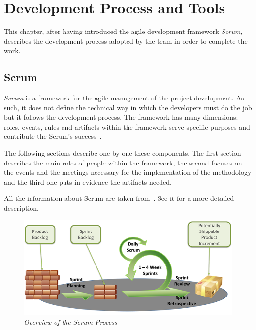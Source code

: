 \chapter{Development Process and Tools}\label{devProcChap}
This chapter, after having introduced the agile development framework \emph{Scrum}, describes the development process adopted by the team in order to complete the work.

	\section{Scrum}\label{ref_scrum}
	\emph{Scrum} is a framework for the agile management of the project development. 
	As such, it does not define the technical way in which the developers must do the job but it follows the development process. 	
	The framework has many dimensions: roles, events, rules and artifacts within the framework serve specific purposes and contribute the Scrum's success~\cite{scrumEnglishGuide}.  

	The following sections describe one by one these components. The first section describes the main roles of people within the framework, the second focuses on the events and the meetings necessary for the implementation of the methodology and the third one puts in evidence the artifacts needed.

	All the information about Scrum are taken from~\cite{scrumEnglishGuide}. See it for a more detailed description.

	\begin{figure}[h]
	  \begin{center} 
	    \includegraphics[scale=0.45]{images/ch_04/scrum_overview.png}
	  \end{center} 
	  \caption{\textit{Overview of the Scrum Process}}  
	  \label{fig:ScrumOverview}
  	\end{figure}

